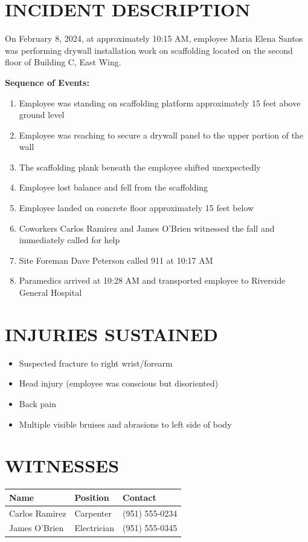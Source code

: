 \documentclass[11pt]{article}
\begin{document}
\section*{INCIDENT DESCRIPTION}

On February 8, 2024, at approximately 10:15 AM, employee Maria Elena Santos was performing drywall installation work on scaffolding located on the second floor of Building C, East Wing.

\textbf{Sequence of Events:}
\begin{enumerate}
\item Employee was standing on scaffolding platform approximately 15 feet above ground level
\item Employee was reaching to secure a drywall panel to the upper portion of the wall
\item The scaffolding plank beneath the employee shifted unexpectedly
\item Employee lost balance and fell from the scaffolding
\item Employee landed on concrete floor approximately 15 feet below
\item Coworkers Carlos Ramirez and James O'Brien witnessed the fall and immediately called for help
\item Site Foreman Dave Peterson called 911 at 10:17 AM
\item Paramedics arrived at 10:28 AM and transported employee to Riverside General Hospital
\end{enumerate}

\section*{INJURIES SUSTAINED}

\begin{itemize}
\item Suspected fracture to right wrist/forearm
\item Head injury (employee was conscious but disoriented)
\item Back pain
\item Multiple visible bruises and abrasions to left side of body
\end{itemize}

\section*{WITNESSES}

\begin{tabular}{@{}p{4cm}p{4cm}p{6cm}@{}}
\toprule
\textbf{Name} & \textbf{Position} & \textbf{Contact} \\
\midrule
Carlos Ramirez & Carpenter & (951) 555-0234 \\
James O'Brien & Electrician & (951) 555-0345 \\
\bottomrule
\end{tabular}
\end{document}
